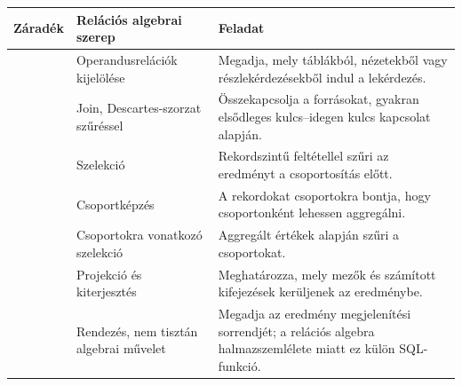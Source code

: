 \begin{tabularx}{\textwidth}{L{25mm}L{32mm}X}
\toprule
\textbf{Záradék} & \textbf{Relációs algebrai szerep} & \textbf{Feladat} \\
\midrule
{} & Operandusrelációk kijelölése & Megadja, mely táblákból, nézetekből vagy részlekérdezésekből indul a lekérdezés. \\
 & Join, Descartes-szorzat szűréssel & Összekapcsolja a forrásokat, gyakran elsődleges kulcs--idegen kulcs kapcsolat alapján. \\
 & Szelekció & Rekordszintű feltétellel szűri az eredményt a csoportosítás előtt. \\
 & Csoportképzés & A rekordokat csoportokra bontja, hogy csoportonként lehessen aggregálni. \\
 & Csoportokra vonatkozó szelekció & Aggregált értékek alapján szűri a csoportokat. \\
 & Projekció és kiterjesztés & Meghatározza, mely mezők és számított kifejezések kerüljenek az eredménybe. \\
 & Rendezés, nem tisztán algebrai művelet & Megadja az eredmény megjelenítési sorrendjét; a relációs algebra halmazszemlélete miatt ez külön SQL-funkció. \\
\bottomrule
\end{tabularx}
